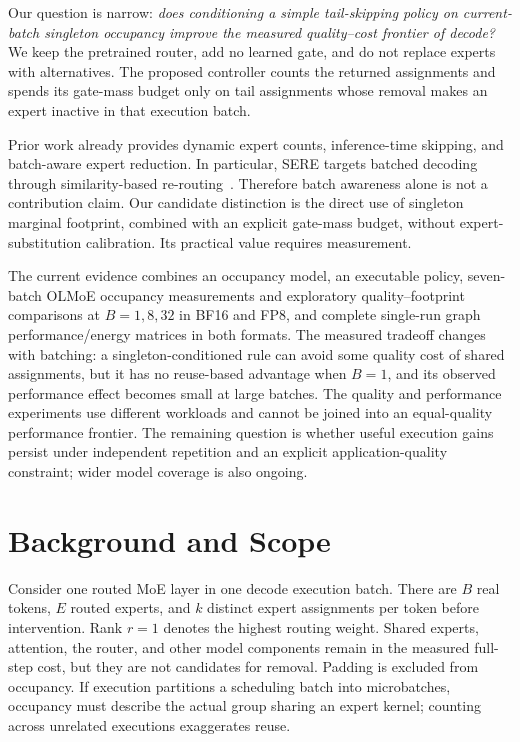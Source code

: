 \documentclass[10pt,twocolumn]{article}
\begin{document}
Our question is narrow: \emph{does conditioning a simple tail-skipping policy on current-batch singleton occupancy improve the measured quality--cost frontier of decode?} We keep the pretrained router, add no learned gate, and do not replace experts with alternatives. The proposed controller counts the returned assignments and spends its gate-mass budget only on tail assignments whose removal makes an expert inactive in that execution batch.

Prior work already provides dynamic expert counts, inference-time skipping, and batch-aware expert reduction. In particular, SERE targets batched decoding through similarity-based re-routing~\cite{sere}. Therefore batch awareness alone is not a contribution claim. Our candidate distinction is the direct use of singleton marginal footprint, combined with an explicit gate-mass budget, without expert-substitution calibration. Its practical value requires measurement.

The current evidence combines an occupancy model, an executable policy, seven-batch OLMoE occupancy measurements and exploratory quality--footprint comparisons at $B=1,8,32$ in BF16 and FP8, and complete single-run graph performance/energy matrices in both formats. The measured tradeoff changes with batching: a singleton-conditioned rule can avoid some quality cost of shared assignments, but it has no reuse-based advantage when $B=1$, and its observed performance effect becomes small at large batches. The quality and performance experiments use different workloads and cannot be joined into an equal-quality performance frontier. The remaining question is whether useful execution gains persist under independent repetition and an explicit application-quality constraint; wider model coverage is also ongoing.

\section{Background and Scope}
Consider one routed MoE layer in one decode execution batch. There are $B$ real tokens, $E$ routed experts, and $k$ distinct expert assignments per token before intervention. Rank $r=1$ denotes the highest routing weight. Shared experts, attention, the router, and other model components remain in the measured full-step cost, but they are not candidates for removal. Padding is excluded from occupancy. If execution partitions a scheduling batch into microbatches, occupancy must describe the actual group sharing an expert kernel; counting across unrelated executions exaggerates reuse.
\end{document}
